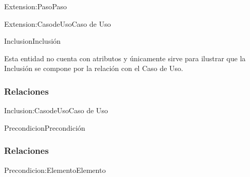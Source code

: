 \begin{BusinessFact}{Extension:Paso}{Paso}
\end{BusinessFact}

\begin{BusinessFact}{Extension:CasodeUso}{Caso de Uso}
\end{BusinessFact}


\begin{BusinessEntity}{Inclusion}{Inclusión}
	\item Esta entidad no cuenta con atributos y únicamente sirve para ilustrar que la Inclusión se compone por la relación con el Caso de Uso.
\end{BusinessEntity}

\subsubsection{Relaciones}

\begin{BusinessFact}{Inclusion:CasodeUso}{Caso de Uso}
\end{BusinessFact}


\begin{BusinessEntity}{Precondicion}{Precondición}
	
\end{BusinessEntity}

\subsubsection{Relaciones}

\begin{BusinessFact}{Precondicion:Elemento}{Elemento}
\end{BusinessFact}

